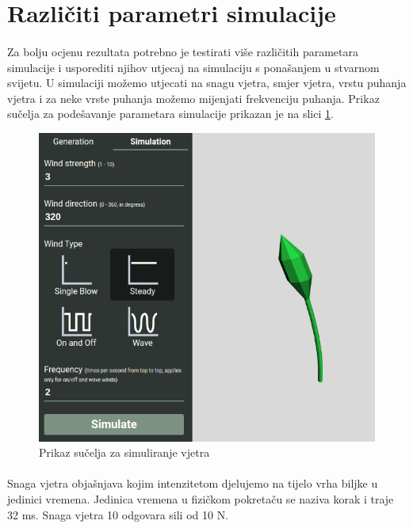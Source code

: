 \documentclass[times, utf8, diplomski]{fer}
\begin{document}
\paragraph{}

\section{Različiti parametri simulacije}
\paragraph{}
Za bolju ocjenu rezultata potrebno je testirati više različitih parametara simulacije i 
usporediti njihov utjecaj na simulaciju s ponašanjem u stvarnom svijetu. U simulaciji možemo 
utjecati na snagu vjetra, smjer vjetra, vrstu puhanja vjetra i za neke vrste puhanja možemo 
mijenjati frekvenciju puhanja. Prikaz sučelja za podešavanje parametara simulacije prikazan 
je na slici \ref{fig:43-4}.

\begin{figure}[h]
	\centering
	\includegraphics[width=1\textwidth]{img/43-4}
	\caption{Prikaz sučelja za simuliranje vjetra}
	\label{fig:43-4}
\end{figure}

\paragraph{}
Snaga vjetra objašnjava kojim intenzitetom djelujemo na tijelo vrha biljke u jedinici 
vremena. Jedinica vremena u fizičkom pokretaču se naziva korak i traje 32 ms. Snaga vjetra 
10 odgovara sili od 10 N. 
\end{document}
